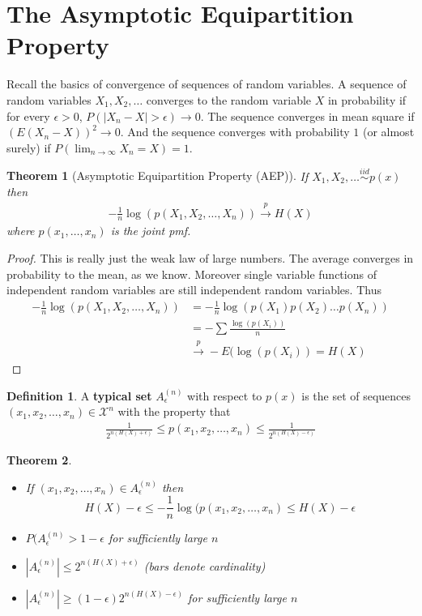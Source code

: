 \documentclass{article}
\theoremstyle{definition}
\newtheorem{definition}{Definition}[section]
\theoremstyle{plain}
\newtheorem{theorem}{Theorem}[section]
\begin{document}
\section{The Asymptotic Equipartition Property}
Recall the basics of convergence of sequences of random variables. A sequence of random variables $X_1,X_2,\ldots$ converges to the random variable $X$ in probability if for every $\epsilon > 0$, $P(|X_n - X| > \epsilon) \to 0$. The sequence converges in mean square if $(E(X_n - X))^2 \to 0$. And the sequence converges with probability $1$ (or almost surely) if $P(\lim_{n \to \infty} X_n = X) = 1$.
\begin{theorem}[Asymptotic Equipartition Property (AEP)]
	If $X_1,X_2,\ldots \overset{iid}{\sim} p(x)$ then
\begin{align}
	-\frac{1}{n}\log(p(X_1,X_2,\ldots,X_n)) \overset{p}{\to} H(X)
\end{align}
where $p(x_1,\ldots,x_n)$ is the joint pmf. 
\end{theorem}
\begin{proof}
	This is really just the weak law of large numbers. The average converges in probability to the mean, as we know. Moreover single variable functions of independent random variables are still independent random variables. Thus
\begin{align}
	-\frac{1}{n}\log(p(X_1,X_2,\ldots,X_n)) &= -\frac{1}{n}\log(p(X_1)p(X_2)\ldots p(X_n)) \\
	&= -\sum \frac{\log(p(X_i))}{n} \\
	&\overset{p}{\to} -E(\log(p(X_i)) = H(X) 
\end{align}
\end{proof}
\begin{definition}
	A \textbf{typical set} $A_{\epsilon}^{(n)}$ with respect to $p(x)$ is the set of sequences $(x_1,x_2,\ldots,x_n) \in \mathcal{X}^n$ with the property that
	\begin{align}
		\frac{1}{2^{n(H(X)+\epsilon)}} \leq p(x_1,x_2,\ldots,x_n) \leq \frac{1}{2^{n(H(X)-\epsilon)}}
	\end{align}
\end{definition}
\begin{theorem}
	\begin{itemize}
		\item[(1)] If $(x_1,x_2,\ldots,x_n) \in A^{(n)}_{\epsilon}$ then
		\[ H(X) - \epsilon \leq -\frac{1}{n}\log(p(x_1,x_2,\ldots,x_n) \leq H(X)-\epsilon \]
		\item[(2)] $P(A^{(n)}_{\epsilon} > 1-\epsilon$ for sufficiently large $n$
		\item[(3)] $|A^{(n)}_{\epsilon}| \leq 2^{n(H(X)+\epsilon)}$ (bars denote cardinality)
		\item[(4)] $|A^{(n)}_{\epsilon}| \geq (1-\epsilon)2^{n(H(X)-\epsilon)}$ for sufficiently large $n$
	\end{itemize}
\end{theorem}
\end{document}
